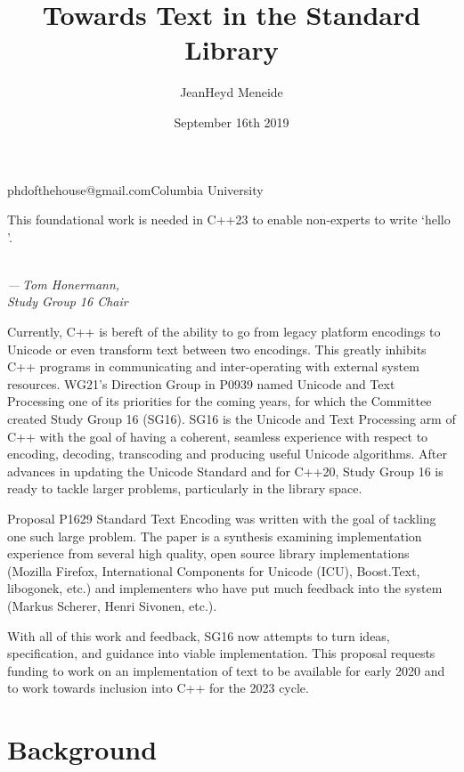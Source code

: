 \documentclass{wg21}
\begin{document}
\title{Towards Text in the Standard Library}
\author{JeanHeyd Meneide}{phdofthehouse@gmail.com}{Columbia University}
\date{September 16th 2019}

\maketitle

\epigraph{This foundational work is needed in C++23 to enable non-experts to write ‘hello ’.}{\textit{\\— Tom Honermann,\\Study Group 16 Chair}}

Currently, C++ is bereft of the ability to go from legacy platform encodings to Unicode or even transform text between two encodings. This greatly inhibits C++ programs in communicating and inter-operating with external system resources. WG21's Direction Group in P0939 named Unicode and Text Processing one of its priorities for the coming years\cite{p0939}, for which the Committee created Study Group 16 (SG16). SG16 is the Unicode and Text Processing arm of C++ with the goal of having a coherent, seamless experience with respect to encoding, decoding, transcoding and producing useful Unicode algorithms. After advances in updating the Unicode Standard\cite{p1025} and \cite{p0482} for C++20, Study Group 16 is ready to tackle larger problems, particularly in the library space.

Proposal P1629 Standard Text Encoding\cite{p1629} was written with the goal of tackling one such large problem. The paper is a synthesis examining implementation experience from several high quality, open source library implementations (Mozilla Firefox, International Components for Unicode (ICU)\cite{icu}, Boost.Text\cite{boost.text}, libogonek\cite{libogonek}, etc.) and implementers who have put much feedback into the system (Markus Scherer, Henri Sivonen, etc.).

With all of this work and feedback\cite{p1629_feedback}, SG16 now attempts to turn ideas, specification, and guidance into viable implementation. This proposal requests funding to work on an implementation of text to be available for early 2020 and to work towards inclusion into C++ for the 2023 cycle.


\section{Background}
\end{document}
